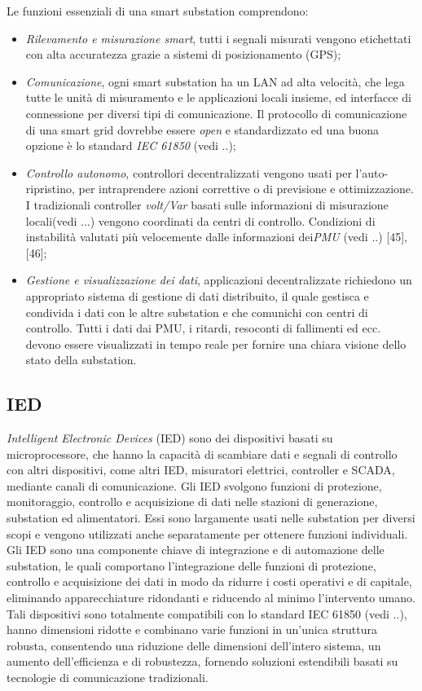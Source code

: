 Le funzioni essenziali di una smart substation comprendono:
\begin{itemize}
	\item \emph{Rilevamento e misurazione smart}, tutti i segnali misurati vengono etichettati con alta accuratezza grazie a sistemi di posizionamento (GPS);
	\item \emph{Comunicazione}, ogni smart substation ha un LAN ad alta velocità, che lega tutte le unità di misuramento e le applicazioni locali insieme, ed interfacce di connessione per diversi tipi di comunicazione. Il protocollo di comunicazione di una smart grid dovrebbe essere \emph{open} e standardizzato ed una buona opzione è lo standard \emph{IEC 61850} (vedi ..);
	\item \emph{Controllo autonomo}, controllori decentralizzati vengono usati per l'auto-ripristino, per intraprendere azioni correttive o di previsione e ottimizzazione. I tradizionali controller \emph{volt/Var} basati sulle informazioni di misurazione locali(vedi ...) vengono coordinati da centri di controllo. Condizioni di instabilità valutati più velocemente dalle informazioni dei\emph{PMU} (vedi ..) [45], [46];
	\item \emph{Gestione e visualizzazione dei dati}, applicazioni decentralizzate richiedono un appropriato sistema di gestione di dati distribuito, il quale gestisca e condivida i dati con le altre substation e che comunichi con centri di controllo. Tutti i dati dai PMU, i ritardi, resoconti di fallimenti ed ecc. devono essere visualizzati in tempo reale per fornire una chiara visione dello stato della substation. 
\end{itemize}
 
\subsection{IED}
\emph{Intelligent Electronic Devices} (IED) sono dei dispositivi basati su microprocessore, che hanno la capacità di scambiare dati e segnali di controllo con altri dispositivi, come altri IED, misuratori elettrici, controller e SCADA, mediante canali di comunicazione. Gli IED svolgono funzioni di protezione, monitoraggio, controllo e acquisizione di dati nelle stazioni di generazione, substation ed alimentatori. Essi sono largamente usati nelle substation per diversi scopi e vengono utilizzati anche separatamente per ottenere funzioni individuali. Gli IED sono una componente chiave di integrazione e di automazione delle substation, le quali comportano l'integrazione delle funzioni di protezione, controllo e acquisizione dei dati in modo da ridurre i costi operativi e di capitale, eliminando apparecchiature ridondanti e riducendo al minimo l'intervento umano. Tali dispositivi sono totalmente compatibili con lo standard IEC  61850 (vedi ..), hanno dimensioni ridotte e combinano varie funzioni in un'unica struttura robusta, consentendo una riduzione delle dimensioni dell'intero sistema, un aumento dell'efficienza e di robustezza, fornendo soluzioni estendibili basati su tecnologie di comunicazione tradizionali. 


